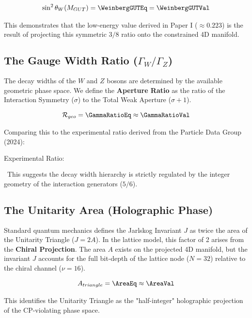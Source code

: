 \begin{equation}
    \sin^2 \theta_W(M_{GUT}) = \WeinbergGUTEq = \WeinbergGUTVal
\end{equation}

This demonstrates that the low-energy value derived in Paper I ($\approx 0.223$) is the result of projecting this symmetric $3/8$ ratio onto the constrained 4D manifold.

\subsection{The Gauge Width Ratio (\texorpdfstring{$\Gamma_W / \Gamma_Z$}{GammaWDivGammaZ})}
The decay widths of the $W$ and $Z$ bosons are determined by the available geometric phase space. We define the \textbf{Aperture Ratio} as the ratio of the Interaction Symmetry ($\sigma$) to the Total Weak Aperture ($\sigma+1$).

\begin{equation}
    \mathcal{R}_{geo} = \GammaRatioEq \approx \GammaRatioVal
\end{equation}

Comparing this to the experimental ratio derived from the Particle Data Group (2024):
\begin{center}
    Experimental Ratio: \GammaRatioExperimentalValue
\end{center}

\GammaRatioAccText \ This suggests the decay width hierarchy is strictly regulated by the integer geometry of the interaction generators ($5/6$).

\subsection{The Unitarity Area (Holographic Phase)}
Standard quantum mechanics defines the Jarlskog Invariant $J$ as twice the area of the Unitarity Triangle ($J = 2A$). In the lattice model, this factor of 2 arises from the \textbf{Chiral Projection}. The area $A$ exists on the projected 4D manifold, but the invariant $J$ accounts for the full bit-depth of the lattice node ($N=32$) relative to the chiral channel ($\nu=16$).

\begin{equation}
    A_{triangle} = \AreaEq \approx \AreaVal
\end{equation}

This identifies the Unitarity Triangle as the "half-integer" holographic projection of the CP-violating phase space.